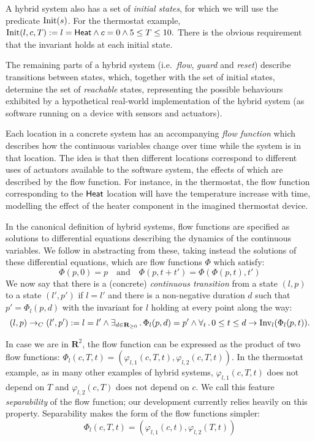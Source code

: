 \documentclass[runningheads]{llncs}
\newcommand{\Exists}[2]{\exists_{#1} \, . \, #2}
\newcommand{\Forall}[2]{\forall_{#1} \, . \, #2}
\def\phi{\varphi}
\newcommand{\IR}{{\mathbf R}}
\newcommand{\Heat}{{\sf Heat}}
\newcommand{\Inv}{{\rm Inv}}
\newcommand{\Init}{{\rm Init}}
\newcommand{\contrans}{\rightarrow_C}
\newcommand{\Dur}{{\IR_{\geq 0}}}
\begin{document}
A hybrid system also has a set of \emph{initial states}, for which we
will use the predicate $\Init(s)$.  For the thermostat example,
$\Init(l,c,T) := l= \Heat \wedge c= 0 \wedge 5 \leq T \leq 10.$
There is the obvious requirement that the invariant holds at each
initial state.


The remaining parts of a hybrid system (i.e.\ {\em flow}, {\em guard}
and {\em reset}) describe transitions between states, which, together
with the set of initial states, determine the set of \emph{reachable}
states, representing the possible behaviours exhibited by a
hypothetical real-world implementation of the hybrid system (as
software running on a device with sensors and actuators).

Each location in a concrete system has an accompanying \emph{flow
  function} which describes how the continuous variables change over
time while the system is in that location. The idea is that then
different locations correspond to different uses of actuators
available to the software system, the effects of which are described
by the flow function. For instance, in the thermostat, the flow
function corresponding to the $\Heat$ location will have the
temperature increase with time, modelling the effect of the heater
component in the imagined thermostat device.

In the canonical definition of hybrid systems, flow functions are
specified as solutions to differential equations describing the
dynamics of the continuous variables. We follow \cite{alur} in
abstracting from these, taking instead the solutions of these
differential equations, which are flow functions $\Phi$ which satisfy:
$$\Phi( p, 0) = p \quad \mbox{and} \quad \Phi (p, t + t') = \Phi (\Phi( p, t), t')$$
We now say that there is a (concrete) \emph{continuous transition}
from a state $(l, p)$ to a state $(l', p')$ if $l = l'$ and there is a
non-negative duration $d$ such that $p' = \Phi_l( p,d)$ with the
invariant for $l$ holding at every point along the way:
$$ (l,p) \contrans (l',p') := l=l' \wedge \Exists{d\in
\Dur}{\Phi_l(p, d) = p' \wedge \Forall{t}{0 \leq t\leq d \rightarrow
\Inv_l(\Phi_l (p, t))}}.$$

In case we are in $\IR ^2$, the flow function can be expressed as the
product of two flow functions: $\Phi_l(c,T,t) = (\phi_{l,1}(c,T,t),
\phi_{l,2}(c,T,t))$. In the thermostat example, as in many other
examples of hybrid systems, $\phi_{l,1}(c,T,t)$ does not depend on $T$
and $\phi_{l,2}(c,T)$ does not depend on $c$. We call this feature
{\em separability\/} of the flow function; our development currently
relies heavily on this property. Separability makes the form of the
flow functions simpler:
$$\Phi_l(c,T,t) = (\phi_{l,1}(c,t), \phi_{l,2}(T,t))$$
\end{document}
